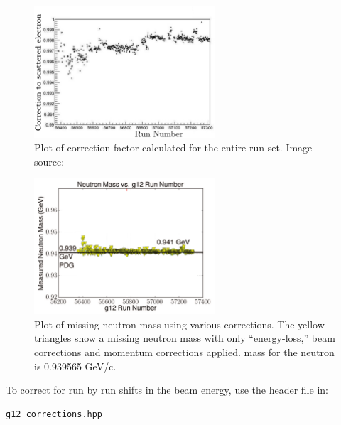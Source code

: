\begin{figure}\begin{center}
\includegraphics[width=0.6\textwidth]{figures/calib/tag/ecor/beam_cor.eps}
\caption[Beam Correction Factors for Entire  Runs]{\label{fig:beamcor.run} Plot of correction factor calculated for the entire  run set. Image source:~\cite{clas.thesis.kunkel}}
\end{center}\end{figure}

\begin{figure}\begin{center}
\includegraphics[width=0.6\textwidth]{figures/calib/tag/ecor/C3pi_allcorr_neutron_rxr.pdf}
\caption[Corrected Missing Neutron Mass for  Using Beam Corrections]{\label{fig:neutron.fixall} Plot of missing neutron mass using various corrections. The yellow triangles show a missing neutron mass with only ``energy-loss,'' beam corrections and momentum corrections applied.  mass for the neutron is 0.939565 GeV/c.}
\end{center}\end{figure}



To correct for run by run shifts in the beam energy, use the header file in:
\begin{verbatim}
g12_corrections.hpp
\end{verbatim}

